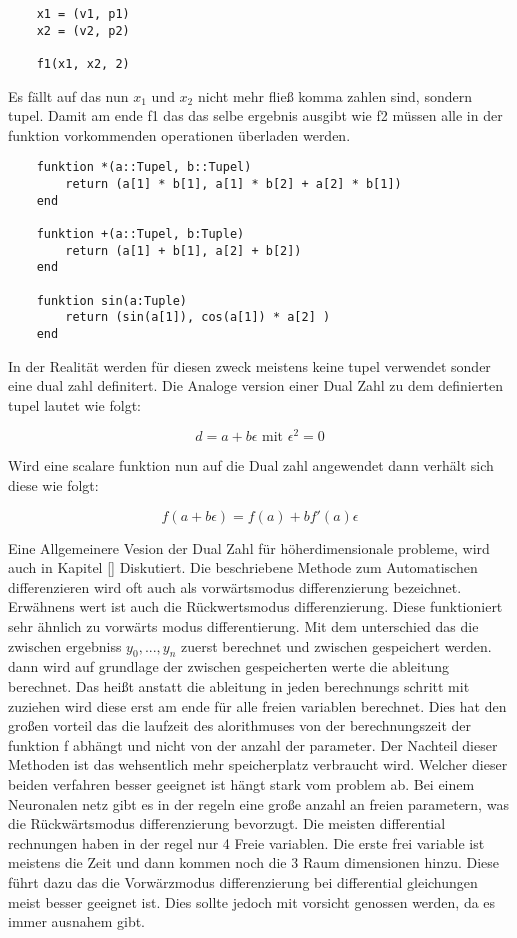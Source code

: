 \begin{lstlisting}
	x1 = (v1, p1)
    x2 = (v2, p2)
    
    f1(x1, x2, 2)
\end{lstlisting}


Es fällt auf das nun $x_1$ und $x_2$ nicht mehr fließ komma zahlen sind, sondern tupel.
Damit am ende f1 das das selbe ergebnis ausgibt wie f2 müssen alle in der funktion vorkommenden operationen überladen werden.

\begin{lstlisting}
	funktion *(a::Tupel, b::Tupel)
    	return (a[1] * b[1], a[1] * b[2] + a[2] * b[1]) 
    end
    
    funktion +(a::Tupel, b:Tuple)
    	return (a[1] + b[1], a[2] + b[2])
    end
    
    funktion sin(a:Tuple)
    	return (sin(a[1]), cos(a[1]) * a[2] ) 
    end
\end{lstlisting}


In der Realität werden für diesen zweck meistens keine tupel verwendet sonder eine dual zahl definitert.
Die Analoge version einer Dual Zahl zu dem definierten tupel lautet wie folgt:

$$
	d = a + b \epsilon \text{ mit } \epsilon^2 = 0
$$

Wird eine scalare funktion nun auf die Dual zahl angewendet dann verhält sich diese wie folgt:

$$
	f( a + b \epsilon) = f(a) + b f'(a) \epsilon
$$

Eine Allgemeinere Vesion der Dual Zahl für höherdimensionale probleme, wird auch in Kapitel \ref{} Diskutiert.
Die beschriebene Methode zum Automatischen differenzieren wird oft auch als vorwärtsmodus differenzierung bezeichnet.
Erwähnens wert ist auch die Rückwertsmodus differenzierung.
Diese funktioniert sehr ähnlich zu vorwärts modus differentierung.
Mit dem unterschied das die zwischen ergebniss $y_0, ... , y_n$ zuerst berechnet und zwischen gespeichert werden.
dann wird auf grundlage der zwischen gespeicherten werte die ableitung berechnet.
Das heißt anstatt die ableitung in jeden berechnungs schritt mit zuziehen wird diese erst am ende für alle freien variablen berechnet.
Dies hat den großen vorteil das die laufzeit des alorithmuses von der berechnungszeit der funktion f abhängt und nicht von der anzahl der parameter.
Der Nachteil dieser Methoden ist das wehsentlich mehr speicherplatz verbraucht wird.
Welcher dieser beiden verfahren besser geeignet ist hängt stark vom problem ab.
Bei einem Neuronalen netz gibt es in der regeln eine große anzahl an freien parametern, was die Rückwärtsmodus differenzierung bevorzugt.
Die meisten differential rechnungen haben in der regel nur 4 Freie variablen.
Die erste frei variable ist meistens die Zeit und dann kommen noch die 3 Raum dimensionen hinzu.
Diese führt dazu das die Vorwärzmodus differenzierung bei differential gleichungen meist besser geeignet ist.
Dies sollte jedoch mit vorsicht genossen werden, da es immer ausnahem gibt.


